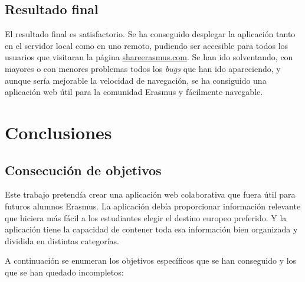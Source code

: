 \documentclass[a4paper, 12pt]{book}
\begin{document}
\section{Resultado final} 
\label{sec:resultado-final}

El resultado final es satisfactorio. Se ha conseguido desplegar la aplicación tanto en el servidor local como en uno remoto, pudiendo ser accesible para todos los usuarios que visitaran la página \url{shareerasmus.com}. Se han ido solventando, con mayores o con menores problemas todos los \textit{bugs} que han ido apareciendo, y aunque sería mejorable la velocidad de navegación, se ha consiguido una aplicación web útil para la comunidad Erasmus y fácilmente navegable.





\cleardoublepage
\chapter{Conclusiones}
\label{chap:conclusiones}


\section{Consecución de objetivos}
\label{sec:consecucion-objetivos}

Este trabajo pretendía crear una aplicación web colaborativa que fuera útil para futuros alumnos Erasmus. La aplicación debía proporcionar información relevante que hiciera más fácil a los estudiantes elegir el destino europeo preferido. Y la aplicación tiene la capacidad de contener toda esa información bien organizada y dividida en distintas categorías. 
\newline

A continuación se enumeran los objetivos específicos que se han conseguido y los que se han quedado incompletos:
\end{document}
